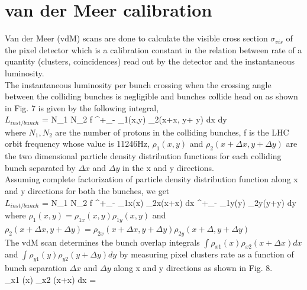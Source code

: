 \newpage \section{van der Meer calibration}
\label{sec:vdm}
Van der Meer (vdM) scans are done to calculate the visible cross section $\sigma_{vis}$ of the pixel detector which is a calibration constant in the relation between rate of a quantity (clusters, coincidences) read out by the detector and the instantaneous luminosity. \\

The instantaneous luminosity  per bunch crossing when the crossing angle between the colliding bunches is negligible and bunches collide head on as shown in Fig. 7 is given by the following integral, \cite{CMS-PAS-LUM-13-001} \\

$L_{inst/bunch}$ = N_1 N_2 f \int^{+\infty}_{-\infty} \rho_1(x,y) \rho_2(x+\Delta x, y+ \Delta y) dx dy \\

where $N_1, N_2$ are the number of protons in the colliding bunches, f is the LHC orbit frequency whose value is 11246Hz,  $\rho_1(x,y)$ and $\rho_2(x+\Delta x,y+\Delta y)$ are the two dimensional particle density distribution functions for each colliding bunch separated by $\Delta x$ and $\Delta y$ in the x and y directions. \\

Assuming complete factorization of particle density distribution function along x and y directions for both the bunches, we get \\

$L_{inst/bunch}$ = N_1 N_2 f \int^{+\infty}_{-\infty} \rho_{1x}(x) \rho_{2x}(x+\Delta x)  dx   \int^{+\infty}_{-\infty} \rho_{1y}(y) \rho_{2y}(y+\Delta y)  dy \\

where $\rho_1(x,y) = \rho_{1x}(x,y) \rho_{1y} (x,y)$ and $\rho_2(x+\Delta x,y + \Delta y) = \rho_{2x}(x+\Delta x,y+\Delta y) \rho_{2y} (x+\Delta,y+\Delta y)$ \\

The vdM scan determines the bunch  overlap integrals $\int \rho_{x1} (x) \rho_{x2} (x+\Delta x) dx$ and  $\int \rho_{y1}(y) \rho_{y2} (y+\Delta y) dy$ by measuring pixel clusters rate as a function of bunch separation $\Delta x$ and $\Delta y$ along x and y directions as shown in Fig. 8. \\

\int \rho_{x1} (x) \rho_{x2} (x+\Delta x) dx =  \\

